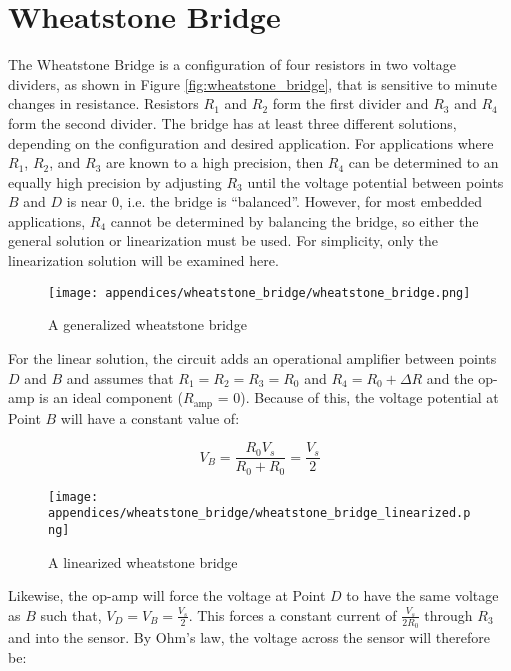 \chapter{Wheatstone Bridge} 
The Wheatstone Bridge is a configuration of four resistors in two voltage dividers, as shown in Figure \ref{fig:wheatstone_bridge}, that is sensitive to minute changes in resistance.
Resistors $R_1$ and $R_2$ form the first divider and $R_3$ and $R_4$ form the second divider.
The bridge has at least three different solutions, depending on the configuration and desired application.
For applications where $R_1$, $R_2$, and $R_3$ are known to a high precision, then $R_4$ can be determined to an equally high precision by adjusting $R_3$ until the voltage potential between points $B$ and $D$ is near 0, i.e. the bridge is ``balanced''.
However, for most embedded applications, $R_4$ cannot be determined by balancing the bridge, so either the general solution or linearization must be used.
For simplicity, only the linearization solution will be examined here.

\begin{figure}[h!]
    \caption{A generalized wheatstone bridge}
    \centering
    \texttt{[image: appendices/wheatstone\_bridge/wheatstone\_bridge.png]}
\end{figure}

For the linear solution, the circuit adds an operational amplifier between points $D$ and $B$ and assumes that $R_1=R_2=R_3=R_0$ and $R_4 = R_0 + \Delta R$ and the op-amp is an ideal component ($R_{\text{amp}}$ = 0).
Because of this, the voltage potential at Point $B$ will have a constant value of:

\begin{equation*}
    V_B = \frac{R_0 V_s}{R_0 + R_0} = \frac{V_s}{2}
\end{equation*}

\begin{figure}[h!]
    \caption{A linearized wheatstone bridge}
    \centering
    \texttt{[image: appendices/wheatstone\_bridge/wheatstone\_bridge\_linearized.png]}
\end{figure}

Likewise, the op-amp will force the voltage at Point $D$ to have the same voltage as $B$ such that, $V_D = V_B = \frac{V_s}{2} $.
This forces a constant current of $\frac{V_s}{2R_0} $ through $R_3$ and into the sensor.
By Ohm's law, the voltage across the sensor will therefore be:

